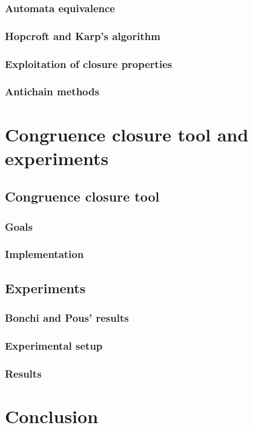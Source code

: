 \subsection{Automata equivalence}

\subsection{Hopcroft and Karp's algorithm}

\subsection{Exploitation of closure properties}

\subsection{Antichain methods}

\chapter{Congruence closure tool and experiments}

\section{Congruence closure tool}

\subsection{Goals}

\subsection{Implementation}

\section{Experiments}

\subsection{Bonchi and Pous' results}

\subsection{}

\subsection{Experimental setup}

\subsection{Results}

\chapter{Conclusion}
